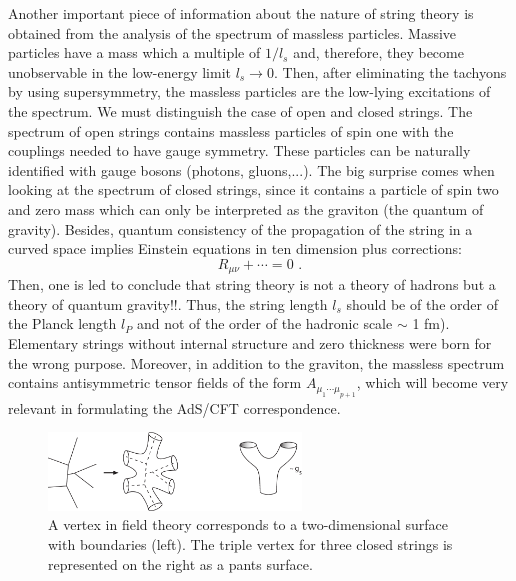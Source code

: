 \documentclass[12pt,notitlepage,a4paper]{article}
\newcommand{\beq}{\begin{equation}}
\newcommand{\eeq}{\end{equation}}
\begin{document}
Another important piece of information about the nature of string theory is obtained from the analysis of the spectrum of massless particles. Massive particles have a mass which a multiple of $1/l_s$ and, therefore, they become unobservable in the low-energy limit $l_s\to 0$. Then, after eliminating the tachyons by using supersymmetry, the massless particles are the low-lying excitations of the spectrum. We must distinguish the case of open and closed strings. The spectrum of open strings contains massless particles of spin one with the couplings needed to have gauge symmetry. These particles can be naturally identified with gauge bosons (photons, gluons,...). The big surprise comes when looking at the spectrum of  closed strings, since  it contains a particle of spin two and zero mass which can only be interpreted as the graviton (the quantum of gravity). Besides, quantum consistency of the propagation of the string in a curved space implies Einstein equations in ten dimension plus corrections:
\beq
R_{\mu\nu}+\cdots=0\,\,.
\eeq
Then, one is led to conclude that string theory is not a theory of hadrons but a  theory of quantum gravity!!.  Thus, the string length $l_s$ should be of the order of the Planck length $l_P$ and not of the order of the hadronic scale $\sim$ 1 fm).  Elementary strings without internal structure and zero thickness were born for the wrong purpose. Moreover, in addition to the graviton, the massless spectrum contains antisymmetric tensor fields of the form $A_{\mu_1\cdots\mu_{p+1}}$, which will become very relevant in formulating the AdS/CFT correspondence. 

\begin{figure}[ht]
\center
\includegraphics[width=0.6\textwidth]{Pant2.pdf}
\caption{A vertex in field theory corresponds to a two-dimensional surface with boundaries (left). The triple vertex for three closed strings is represented  on the right as a pants surface. } 
\label{thick_and_triple_vertex}
\end{figure}
\end{document}
